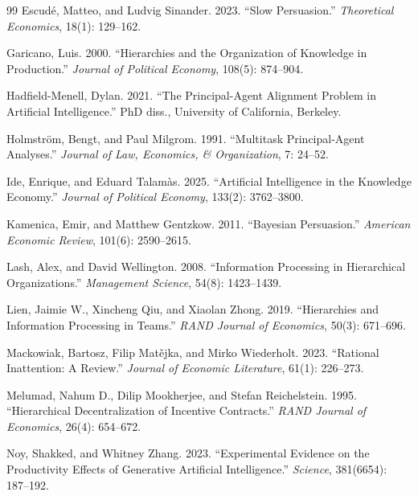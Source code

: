 \begin{thebibliography}{99}
Escud{\'e}, Matteo, and Ludvig Sinander. 2023.
``Slow Persuasion.''
\textit{Theoretical Economics}, 18(1): 129--162.

Garicano, Luis. 2000.
``Hierarchies and the Organization of Knowledge in Production.''
\textit{Journal of Political Economy}, 108(5): 874--904.

Hadfield-Menell, Dylan. 2021.
``The Principal-Agent Alignment Problem in Artificial Intelligence.''
PhD diss., University of California, Berkeley.

Holmstr{\"o}m, Bengt, and Paul Milgrom. 1991.
``Multitask Principal-Agent Analyses.''
\textit{Journal of Law, Economics, \& Organization}, 7: 24--52.

Ide, Enrique, and Eduard Talam{\`a}s. 2025.
``Artificial Intelligence in the Knowledge Economy.''
\textit{Journal of Political Economy}, 133(2): 3762--3800.

Kamenica, Emir, and Matthew Gentzkow. 2011.
``Bayesian Persuasion.''
\textit{American Economic Review}, 101(6): 2590--2615.

Lash, Alex, and David Wellington. 2008.
``Information Processing in Hierarchical Organizations.''
\textit{Management Science}, 54(8): 1423--1439.

Lien, Jaimie W., Xincheng Qiu, and Xiaolan Zhong. 2019.
``Hierarchies and Information Processing in Teams.''
\textit{RAND Journal of Economics}, 50(3): 671--696.

Mackowiak, Bartosz, Filip Mat{\v{e}}jka, and Mirko Wiederholt. 2023.
``Rational Inattention: A Review.''
\textit{Journal of Economic Literature}, 61(1): 226--273.

Melumad, Nahum D., Dilip Mookherjee, and Stefan Reichelstein. 1995.
``Hierarchical Decentralization of Incentive Contracts.''
\textit{RAND Journal of Economics}, 26(4): 654--672.

Noy, Shakked, and Whitney Zhang. 2023.
``Experimental Evidence on the Productivity Effects of Generative Artificial Intelligence.''
\textit{Science}, 381(6654): 187--192.


\end{thebibliography}
